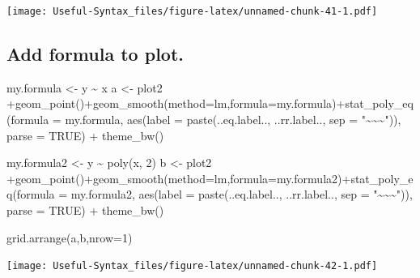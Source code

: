 \documentclass[
]{book}
\newenvironment{Shaded}{\begin{snugshade}}{\end{snugshade}}
\newcommand{\AttributeTok}[1]{\textcolor[rgb]{0.77,0.63,0.00}{#1}}
\newcommand{\ConstantTok}[1]{\textcolor[rgb]{0.00,0.00,0.00}{#1}}
\newcommand{\DecValTok}[1]{\textcolor[rgb]{0.00,0.00,0.81}{#1}}
\newcommand{\FunctionTok}[1]{\textcolor[rgb]{0.00,0.00,0.00}{#1}}
\newcommand{\NormalTok}[1]{#1}
\newcommand{\OtherTok}[1]{\textcolor[rgb]{0.56,0.35,0.01}{#1}}
\newcommand{\SpecialCharTok}[1]{\textcolor[rgb]{0.00,0.00,0.00}{#1}}
\newcommand{\StringTok}[1]{\textcolor[rgb]{0.31,0.60,0.02}{#1}}
\begin{document}
\texttt{[image: Useful-Syntax\_files/figure-latex/unnamed-chunk-41-1.pdf]}

\hypertarget{add-formula-to-plot.}{%
\subsection{Add formula to plot.}\label{add-formula-to-plot.}}

\begin{Shaded}
\begin{Highlighting}[]
\NormalTok{my.formula }\OtherTok{\textless{}{-}}\NormalTok{ y }\SpecialCharTok{\textasciitilde{}}\NormalTok{ x}
\NormalTok{a }\OtherTok{\textless{}{-}}\NormalTok{ plot2 }\SpecialCharTok{+}\FunctionTok{geom\_point}\NormalTok{()}\SpecialCharTok{+}\FunctionTok{geom\_smooth}\NormalTok{(}\AttributeTok{method=}\StringTok{\textquotesingle{}lm\textquotesingle{}}\NormalTok{,}\AttributeTok{formula=}\NormalTok{my.formula)}\SpecialCharTok{+}\FunctionTok{stat\_poly\_eq}\NormalTok{(}\AttributeTok{formula =}\NormalTok{ my.formula, }\FunctionTok{aes}\NormalTok{(}\AttributeTok{label =} \FunctionTok{paste}\NormalTok{(..eq.label.., ..rr.label.., }\AttributeTok{sep =} \StringTok{"\textasciitilde{}\textasciitilde{}\textasciitilde{}"}\NormalTok{)), }\AttributeTok{parse =} \ConstantTok{TRUE}\NormalTok{) }\SpecialCharTok{+} \FunctionTok{theme\_bw}\NormalTok{()}

\NormalTok{my.formula2 }\OtherTok{\textless{}{-}}\NormalTok{ y }\SpecialCharTok{\textasciitilde{}} \FunctionTok{poly}\NormalTok{(x, }\DecValTok{2}\NormalTok{)}
\NormalTok{b }\OtherTok{\textless{}{-}}\NormalTok{ plot2 }\SpecialCharTok{+}\FunctionTok{geom\_point}\NormalTok{()}\SpecialCharTok{+}\FunctionTok{geom\_smooth}\NormalTok{(}\AttributeTok{method=}\StringTok{\textquotesingle{}lm\textquotesingle{}}\NormalTok{,}\AttributeTok{formula=}\NormalTok{my.formula2)}\SpecialCharTok{+}\FunctionTok{stat\_poly\_eq}\NormalTok{(}\AttributeTok{formula =}\NormalTok{ my.formula2, }\FunctionTok{aes}\NormalTok{(}\AttributeTok{label =} \FunctionTok{paste}\NormalTok{(..eq.label.., ..rr.label.., }\AttributeTok{sep =} \StringTok{"\textasciitilde{}\textasciitilde{}\textasciitilde{}"}\NormalTok{)), }\AttributeTok{parse =} \ConstantTok{TRUE}\NormalTok{) }\SpecialCharTok{+} \FunctionTok{theme\_bw}\NormalTok{()}

\FunctionTok{grid.arrange}\NormalTok{(a,b,}\AttributeTok{nrow=}\DecValTok{1}\NormalTok{)}
\end{Highlighting}
\end{Shaded}

\texttt{[image: Useful-Syntax\_files/figure-latex/unnamed-chunk-42-1.pdf]}
\end{document}
